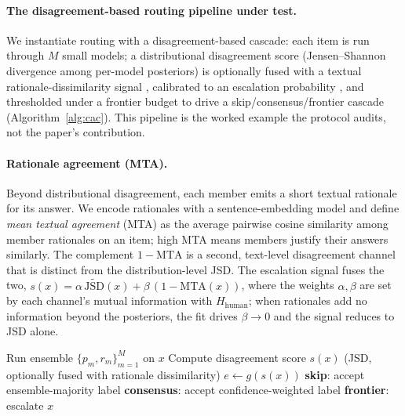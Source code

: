 \documentclass[letterpaper]{article} %
\begin{document}
\paragraph{The disagreement-based routing pipeline under test.}
We instantiate routing with a disagreement-based cascade: each item is run through
$M$ small models; a distributional disagreement score (Jensen--Shannon
divergence \citep{lin1991divergence} among per-model posteriors) is optionally
fused with a textual rationale-dissimilarity signal
\citep{reimers2019sentencebert}, calibrated to an escalation probability
\citep{platt1999probabilistic, zadrozny2002transforming, naeini2015obtaining}, and
thresholded under a frontier budget to drive a skip/consensus/frontier cascade
(Algorithm~\ref{alg:cac}). This pipeline is the worked example the protocol audits,
not the paper's contribution.

\paragraph{Rationale agreement (MTA).}
Beyond distributional disagreement, each member emits a short textual rationale for
its answer. We encode rationales with a sentence-embedding model
\citep{reimers2019sentencebert} and define \emph{mean textual agreement} (MTA) as
the average pairwise cosine similarity among member rationales on an item; high MTA
means members justify their answers similarly. The complement $1{-}\mathrm{MTA}$ is
a second, text-level disagreement channel that is distinct from the
distribution-level JSD. The escalation signal fuses the two,
$s(x)=\alpha\,\widetilde{\mathrm{JSD}}(x)+\beta\,(1{-}\mathrm{MTA}(x))$, where the
weights $\alpha,\beta$ are set by each channel's mutual information with
$H_{\text{human}}$; when rationales add no information beyond the posteriors, the
fit drives $\beta\!\to\!0$ and the signal reduces to JSD alone.

\begin{algorithm}[t]
\caption{Disagreement-based routing for an item $x$}
\label{alg:cac}
\begin{algorithmic}[1]
\STATE Run ensemble $\{p_m, r_m\}_{m=1}^{M}$ on $x$
\STATE Compute disagreement score $s(x)$ (JSD, optionally fused with rationale dissimilarity)
\STATE $e \gets g(s(x))$ 
   \STATE \textbf{skip}: accept ensemble-majority label
   \STATE \textbf{consensus}: accept confidence-weighted label
\ELSE
   \STATE \textbf{frontier}: escalate $x$
\ENDIF
\end{algorithmic}
\end{algorithm}
\end{document}
